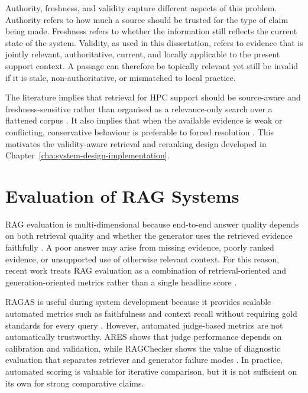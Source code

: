 Authority, freshness, and validity capture different aspects of this problem. Authority refers to how much a source should be trusted for the type of claim being made. Freshness refers to whether the information still reflects the current state of the system. Validity, as used in this dissertation, refers to evidence that is jointly relevant, authoritative, current, and locally applicable to the present support context. A passage can therefore be topically relevant yet still be invalid if it is stale, non-authoritative, or mismatched to local practice. 

The literature implies that retrieval for \ac{HPC} support should be source-aware and freshness-sensitive rather than organised as a relevance-only search over a flattened corpus \citep{hwangRetrievalAugmentedGenerationEstimation2025,liYouKnowWhat2024,ouyangHoHDynamicBenchmark2025}. It also implies that when the available evidence is weak or conflicting, conservative behaviour is preferable to forced resolution \citep{asaiSelfRAGLearningRetrieve2023,liYouKnowWhat2024}. This motivates the validity-aware retrieval and reranking design developed in Chapter~\ref{cha:system-design-implementation}.

\section{Evaluation of RAG Systems}
\label{sec:evaluation}

\ac{RAG} evaluation is multi-dimensional because end-to-end answer quality depends on both retrieval quality and whether the generator uses the retrieved evidence faithfully \citep{RAGAS,ruRAGCheckerFinegrainedFramework2024}. A poor answer may arise from missing evidence, poorly ranked evidence, or unsupported use of otherwise relevant context. For this reason, recent work treats \ac{RAG} evaluation as a combination of retrieval-oriented and generation-oriented metrics rather than a single headline score \citep{RAGAS,saad-falconARESAutomatedEvaluation2024,ruRAGCheckerFinegrainedFramework2024}.

RAGAS is useful during system development because it provides scalable automated metrics such as faithfulness and context recall without requiring gold standards for every query \citep{RAGAS}. However, automated judge-based metrics are not automatically trustworthy. ARES shows that judge performance depends on calibration and validation, while RAGChecker shows the value of diagnostic evaluation that separates retriever and generator failure modes \citep{saad-falconARESAutomatedEvaluation2024,ruRAGCheckerFinegrainedFramework2024}. In practice, automated scoring is valuable for iterative comparison, but it is not sufficient on its own for strong comparative claims. 

